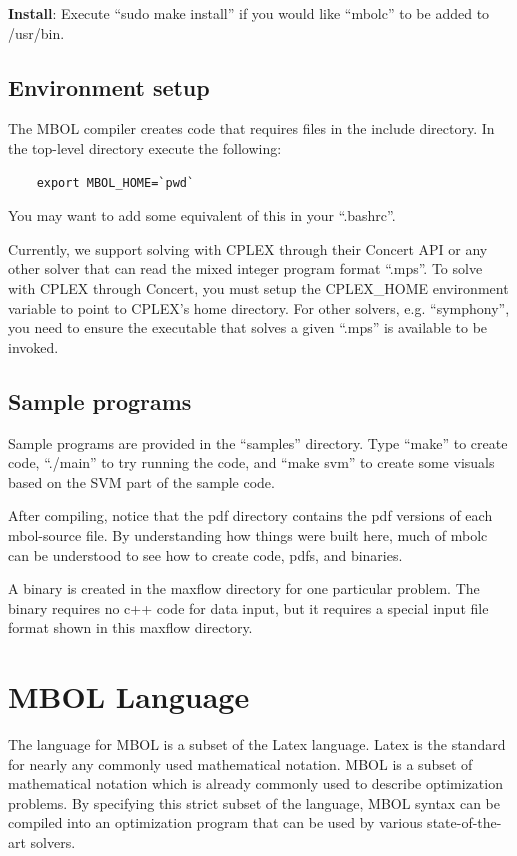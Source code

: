 \documentclass{article}
\begin{document}
\textbf{Install}: Execute ``sudo make install'' if you would like ``mbolc'' to be added to /usr/bin.

\subsection{Environment setup}

The MBOL compiler creates code that requires files in the include directory. In the top-level directory execute the following:
\begin{verbatim}
    export MBOL_HOME=`pwd`
\end{verbatim}
You may want to add some equivalent of this in your ``.bashrc''.

Currently, we support solving with CPLEX through their Concert API or any other solver that can read the mixed integer program format ``.mps''. To solve with CPLEX through Concert, you must setup the CPLEX\_HOME environment variable to point to CPLEX's home directory. For other solvers, e.g. ``symphony'', you need to ensure the executable that solves a given ``.mps'' is available to be invoked.

\subsection{Sample programs}

Sample programs are provided in the ``samples'' directory. Type ``make'' to create code, ``./main'' to try running the code, and ``make svm'' to create some visuals based on the SVM part of the sample code. 

After compiling, notice that the pdf directory contains the pdf versions of each mbol-source file. By understanding how things were built here, much of mbolc can be understood to see how to create code, pdfs, and binaries. 

A binary is created in the maxflow directory for one particular problem. The binary requires no c++ code for data input, but it requires a special input file format shown in this maxflow directory.

\section{MBOL Language}

The language for MBOL is a subset of the Latex language. Latex is the standard for nearly any commonly used mathematical notation. MBOL is a subset of mathematical notation which is already commonly used to describe optimization problems. By specifying this strict subset of the language, MBOL syntax can be compiled into an optimization program that can be used by various state-of-the-art solvers.
\end{document}
